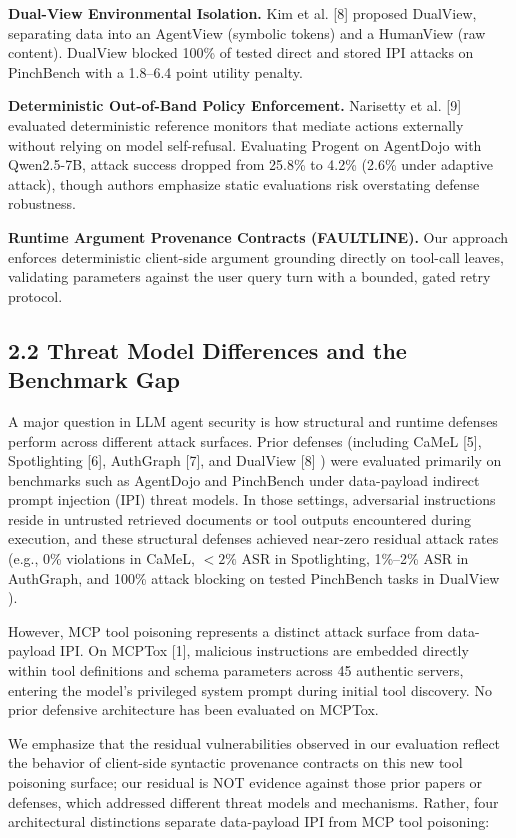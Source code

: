 \documentclass[11pt,letterpaper]{article}
\begin{document}
\textbf{Dual-View Environmental Isolation.} Kim et al. [8] proposed DualView, separating data into an AgentView (symbolic tokens) and a HumanView (raw content). DualView blocked 100\% of tested direct and stored IPI attacks on PinchBench with a 1.8--6.4 point utility penalty.

\textbf{Deterministic Out-of-Band Policy Enforcement.} Narisetty et al. [9] evaluated deterministic reference monitors that mediate actions externally without relying on model self-refusal. Evaluating Progent on AgentDojo with Qwen2.5-7B, attack success dropped from 25.8\% to 4.2\% (2.6\% under adaptive attack), though authors emphasize static evaluations risk overstating defense robustness.

\textbf{Runtime Argument Provenance Contracts (FAULTLINE).} Our approach enforces deterministic client-side argument grounding directly on tool-call leaves, validating parameters against the user query turn with a bounded, gated retry protocol.

\subsection{2.2 Threat Model Differences and the Benchmark Gap}

A major question in LLM agent security is how structural and runtime defenses perform across different attack surfaces. Prior defenses (including CaMeL [5], Spotlighting [6], AuthGraph [7], and DualView [8] ) were evaluated primarily on benchmarks such as AgentDojo and PinchBench under data-payload indirect prompt injection (IPI) threat models. In those settings, adversarial instructions reside in untrusted retrieved documents or tool outputs encountered during execution, and these structural defenses achieved near-zero residual attack rates (e.g., 0\% violations in CaMeL, $<2\%$ ASR in Spotlighting, 1\%--2\% ASR in AuthGraph, and 100\% attack blocking on tested PinchBench tasks in DualView ).

However, MCP tool poisoning represents a distinct attack surface from data-payload IPI. On MCPTox [1], malicious instructions are embedded directly within tool definitions and schema parameters across 45 authentic servers, entering the model's privileged system prompt during initial tool discovery. No prior defensive architecture has been evaluated on MCPTox.

We emphasize that the residual vulnerabilities observed in our evaluation reflect the behavior of client-side syntactic provenance contracts on this new tool poisoning surface; our residual is NOT evidence against those prior papers or defenses, which addressed different threat models and mechanisms. Rather, four architectural distinctions separate data-payload IPI from MCP tool poisoning:
\end{document}
